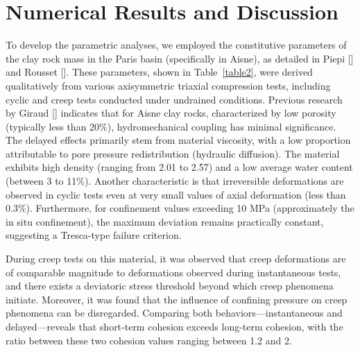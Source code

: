 \documentclass[a4paper,fleqn]{cas-sc}
\begin{document}
\section{Numerical Results and Discussion}\label{}


To develop the parametric analyses, we employed the constitutive parameters of the clay rock mass in the Paris basin (specifically in Aisne), as detailed in Piepi [] and Rousset []. These parameters, shown in Table~\ref{table2}, were derived qualitatively from various axisymmetric triaxial compression tests, including cyclic and creep tests conducted under undrained conditions. Previous research by Giraud [] indicates that for Aisne clay rocks, characterized by low porosity (typically less than 20\%), hydromechanical coupling has minimal significance. The delayed effects primarily stem from material viscosity, with a low proportion attributable to pore pressure redistribution (hydraulic diffusion). The material exhibits high density (ranging from 2.01 to 2.57) and a low average water content (between 3 to 11\%). Another characteristic is that irreversible deformations are observed in cyclic tests even at very small values of axial deformation (less than 0.3\%). Furthermore, for confinement values exceeding 10 MPa (approximately the in situ confinement), the maximum deviation remains practically constant, suggesting a Tresca-type failure criterion.

During creep tests on this material, it was observed that creep deformations are of comparable magnitude to deformations observed during instantaneous tests, and there exists a deviatoric stress threshold beyond which creep phenomena initiate. Moreover, it was found that the influence of confining pressure on creep phenomena can be disregarded. Comparing both behaviors—instantaneous and delayed—reveals that short-term cohesion exceeds long-term cohesion, with the ratio between these two cohesion values ranging between 1.2 and 2.
\end{document}
